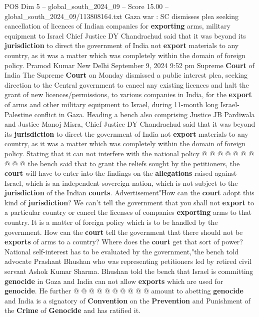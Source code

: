 \begin{textsample}{POS Dim 5 – global\_south\_2024\_09 – Score 15.00 – global\_south\_2024\_09/113808164.txt}  \label{ex:f5_pos_234}
Gaza war : SC dismisses plea seeking cancellation of licences of Indian companies for \textbf{exporting} arms, military equipment to Israel Chief Justice DY Chandrachud said that it was beyond its \textbf{jurisdiction} to direct the government of India not \textbf{export} materials to any country, as it was a matter which was completely within the domain of foreign policy.
Pramod Kumar New Delhi September 9, 2024 9:52 pm Supreme \textbf{Court} of India The Supreme \textbf{Court} on Monday dismissed a public interest plea, seeking direction to the Central government to cancel any existing licences and halt the grant of new licences/permissions, to various companies in India, for the \textbf{export} of arms and other military equipment to Israel, during 11-month long Israel-Palestine conflict in Gaza.
Heading a bench also comprising Justice JB Pardiwala and Justice Manoj Misra, Chief Justice DY Chandrachud said that it was beyond its \textbf{jurisdiction} to direct the government of India not \textbf{export} materials to any country, as it was a matter which was completely within the domain of foreign policy.
Stating that it can not interfere with the national policy @ @ @ @ @ @ @ @ @ @ the bench said that to grant the reliefs sought by the petitioners, the \textbf{court} will have to enter into the findings on the \textbf{allegations} raised against Israel, which is an independent sovereign nation, which is not subject to the \textbf{jurisdiction} of the Indian \textbf{courts}.
Advertisement"How can the \textbf{court} adopt this kind of \textbf{jurisdiction}?
We can't tell the government that you shall not \textbf{export} to a particular country or cancel the licenses of companies \textbf{exporting} arms to that country.
It is a matter of foreign policy which is to be handled by the government.
How can the \textbf{court} tell the government that there should not be \textbf{exports} of arms to a country?
Where does the \textbf{court} get that sort of power?
National self-interest has to be evaluated by the government,"the bench told advocate Prashant Bhushan who was representing petitioners led by retired civil servant Ashok Kumar Sharma.
Bhushan told the bench that Israel is committing \textbf{genocide} in Gaza and India can not allow \textbf{exports} which are used for \textbf{genocide}.
He further @ @ @ @ @ @ @ @ @ @ amount to abetting \textbf{genocide} and India is a signatory of \textbf{Convention} on the \textbf{Prevention} and Punishment of the \textbf{Crime} of \textbf{Genocide} and has ratified it.

\end{textsample}
